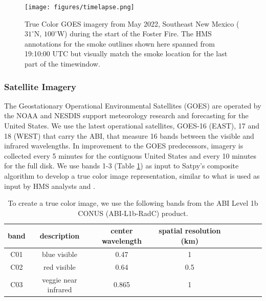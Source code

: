\documentclass{article}
\begin{document}
\begin{figure} \label{timelapse}
    \centering
    \texttt{[image: figures/timelapse.png]}
    \caption{True Color GOES imagery from May 2022, Southeast New Mexico (\(31^{\circ}\)N, \(100^{\circ}\)W) during the start of the Foster Fire. The HMS annotations for the smoke outlines shown here spanned from 19:10:00 UTC but visually match the smoke location for the last part of the timewindow.}
\end{figure}


\subsubsection*{Satellite Imagery} 

The Geostationary Operational Environmental Satellites (GOES) are operated by the NOAA and NESDIS support meteorology research and forecasting for the United States. We use the latest operational satellites, GOES-16 (EAST), 17 and 18 (WEST) that carry the ABI, that measure 16 bands between the visible and infrared wavelengths. In improvement to the GOES predecessors, imagery is collected every 5 minutes for the contiguous United States and every 10 minutes for the full disk. We use bands 1-3 (Table \ref{rgb_bands}) as input to Satpy's composite algorithm to develop a true color image representation, similar to what is used as input by HMS analysts \citep{satpy} and \citep{true_color}.

\begin{table}
    \caption{To create a true color image, we use the following bands from the ABI Level 1b CONUS (ABI-L1b-RadC) product.}\label{rgb_bands}
    \centering
        \begin{tabular}{ccccrrcrc}
            \toprule
            band & description & center wavelength & spatial resolution (km)\\
            \midrule
            C01 &  blue visible & 0.47 & 1 \\
            C02 & red visible & 0.64 & 0.5 \\
            C03 & veggie near infrared & 0.865 & 1 \\
            \bottomrule
        \end{tabular}
\end{table}
\end{document}
